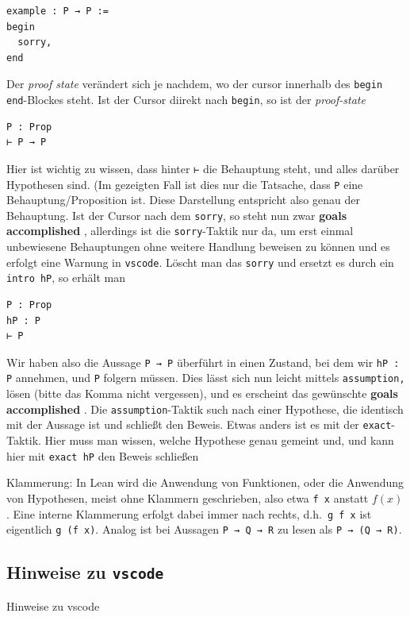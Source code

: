 \documentclass[11pt]{article}
\newcommand{\leanin}{\texttt}
\newcommand{\leanstate}{\texttt}
\begin{document}
\begin{verbatim}
example : P → P := 
begin
  sorry,
end
\end{verbatim}
Der {\em proof state} verändert sich je nachdem, wo der cursor innerhalb des \leanstate{begin end}-Blockes steht. Ist der Cursor diirekt nach \leanstate{begin}, so ist der {\em proof-state}
\begin{verbatim}
P : Prop
⊢ P → P
\end{verbatim}
Hier ist wichtig zu wissen, dass hinter \leanstate{⊢} die Behauptung steht, und alles darüber Hypothesen sind. (Im gezeigten Fall ist dies nur die Tatsache, dass \leanstate{P} eine Behauptung/Proposition ist. Diese Darstellung entspricht also genau der Behauptung. Ist der Cursor nach dem \leanin{sorry}, so steht nun zwar {\bf goals accomplished }, allerdings ist die \leanin{sorry}-Taktik nur da, um erst einmal unbewiesene Behauptungen ohne weitere Handlung beweisen zu können und es erfolgt eine Warnung in {\tt vscode}. Löscht man das \leanin{sorry} und ersetzt es durch ein \leanin{intro hP}, so erhält man
\begin{verbatim}
P : Prop
hP : P
⊢ P
\end{verbatim}
Wir haben also die Aussage \leanstate{P → P} überführt in einen Zustand, bei dem wir \leanstate{hP : P} annehmen, und \leanstate{P} folgern müssen. Dies lässt sich nun leicht mittels \leanin{assumption,} lösen (bitte das Komma nicht vergessen), und es erscheint das gewünschte {\bf goals accomplished }. Die \leanin{assumption}-Taktik such nach einer Hypothese, die identisch mit der Aussage ist und schließt den Beweis. Etwas anders ist es mit der \leanin{exact}-Taktik. Hier muss man wissen, welche Hypothese genau gemeint und, und kann hier mit \leanin{exact hP} den Beweis schließen


Klammerung: In Lean wird die Anwendung von Funktionen, oder die Anwendung von Hypothesen, meist ohne Klammern geschrieben, also etwa \leanstate{f x} anstatt $f(x)$. Eine interne Klammerung erfolgt dabei immer nach rechts, d.h.\ \leanstate{g f x} ist eigentlich \leanstate{g (f x)}. Analog ist bei Aussagen \leanstate{P → Q → R} zu lesen als \leanstate{P → (Q → R)}. 

\subsection{Hinweise zu {\tt vscode}}
Hinweise zu vscode
\end{document}

